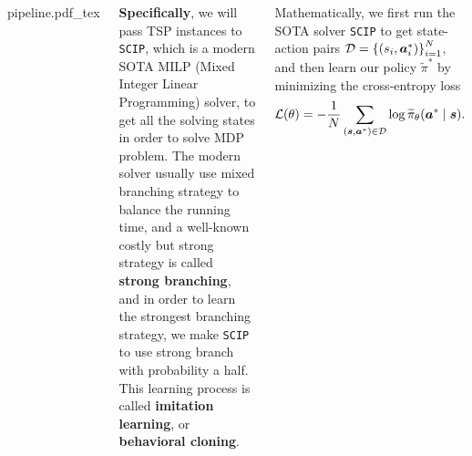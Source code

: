 \documentclass[20pt,,margin=1in,innermargin=-4.5in,blockverticalspace=-0.25in]{tikzposter}
\newcommand{\incfig}[1]{%
	\def\svgwidth{0.35\columnwidth}
	{#1.pdf_tex}
}
\begin{document}
\begin{columns}
{	\begin{tikzfigure}
		\centering
		\incfig{pipeline}
	\end{tikzfigure}
	\textbf{Specifically}, we will pass TSP instances to \texttt{SCIP}, which is a modern SOTA MILP (Mixed Integer Linear Programming) solver, to get all
	the solving states in order to solve MDP problem. The modern solver usually use mixed branching strategy to balance the running
	time, and a well-known costly but strong strategy is called \textbf{strong branching}, and in order to learn the strongest branching strategy, we make
	\texttt{SCIP} to use strong branch with probability a half. This learning process is called \textbf{imitation learning}, or \textbf{behavioral
		cloning}\cite{Efficient-Training-of-artificial-Neural-Networks-for-Autonomous-Navigation}.

	Mathematically, we first run the SOTA solver \texttt{SCIP} to get state-action pairs \(\mathcal{\MakeUppercase{d}} = \left\{(s_{i} , \bm{a} _{i} ^\ast)\right\}_{i = 1}^N\),
	and then learn our policy \(\widetilde{\pi} ^\ast\) by minimizing the cross-entropy loss
	\[
		\mathcal{\MakeUppercase{l}} (\theta ) = - \frac{1}{N}\sum\limits_{(\bm{s}, \bm{a}^\ast)\in \mathcal{\MakeUppercase{d}} }\log \widetilde{\pi}_\theta (\bm{a} ^\ast \mid \bm{s} ).
	\]


	}




\end{columns}
\end{document}
